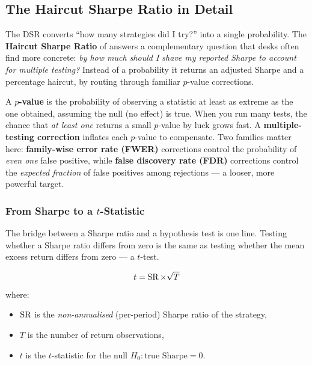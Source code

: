 \subsection{The Haircut Sharpe Ratio in Detail}
\label{sec:eval-haircut-detail}

The DSR converts ``how many strategies did I try?'' into a single probability.
The \textbf{Haircut Sharpe Ratio} of \citet{HarveyLiu2015} answers a complementary question that desks often find more concrete: \emph{by how much should I shave my reported Sharpe to account for multiple testing?}
Instead of a probability it returns an adjusted Sharpe and a percentage haircut, by routing through familiar $p$-value corrections.

\begin{prereq}
A \textbf{$p$-value} is the probability of observing a statistic at least as extreme as the one obtained, assuming the null (no effect) is true.
When you run many tests, the chance that \emph{at least one} returns a small $p$-value by luck grows fast.
A \textbf{multiple-testing correction} inflates each $p$-value to compensate.
Two families matter here: \textbf{family-wise error rate (FWER)} corrections control the probability of \emph{even one} false positive, while \textbf{false discovery rate (FDR)} corrections control the \emph{expected fraction} of false positives among rejections --- a looser, more powerful target.
\end{prereq}

\subsubsection{From Sharpe to a $t$-Statistic}

The bridge between a Sharpe ratio and a hypothesis test is one line.
Testing whether a Sharpe ratio differs from zero is the same as testing whether the mean excess return differs from zero --- a $t$-test.

\begin{equation}
\label{eq:eval-sr-to-t}
t = \operatorname{SR} \times \sqrt{T}
\end{equation}
where:
\begin{itemize}[nosep]
  \item $\operatorname{SR}$ is the \emph{non-annualised} (per-period) Sharpe ratio of the strategy,
  \item $T$ is the number of return observations,
  \item $t$ is the $t$-statistic for the null $H_0: \text{true Sharpe} = 0$.
\end{itemize}

